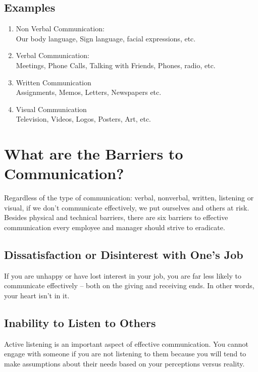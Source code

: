 \documentclass[11pt]{article}
\begin{document}
\subsection{Examples}
	\begin{enumerate}
		\item Non Verbal Communication: \\
			Our body language, Sign language, facial expressions, etc. 
		\item Verbal Communication: \\
			Meetings, Phone Calls, Talking with Friends, Phones, radio, etc. 
		\item Written Communication\\
			Assignments, Memos, Letters, Newspapers etc. 
		\item Visual Communication\\
			Television, Videos, Logos, Posters, Art, etc. 	
\end{enumerate}

\clearpage

\section{What are the Barriers to Communication?}

Regardless of the type of communication: verbal, nonverbal, written, listening or visual, if we don't communicate effectively, we put ourselves and others at risk. Besides physical and technical barriers, there are six barriers to effective communication every employee and manager should strive to eradicate.\\

\subsection{Dissatisfaction or Disinterest with One's Job}

If you are unhappy or have lost interest in your job, you are far less likely to communicate effectively – both on the giving and receiving ends. In other words, your heart isn't in it.

\subsection{Inability to Listen to Others}
Active listening is an important aspect of effective communication. You cannot engage with someone if you are not listening to them because you will tend to make assumptions about their needs based on your perceptions versus reality.
\end{document}
